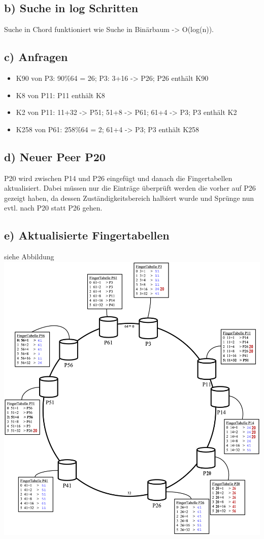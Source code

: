 \documentclass[11pt,a4paper]{scrartcl}
\begin{document}
\subsection*{b) Suche in log Schritten}
Suche in Chord funktioniert wie Suche in Binärbaum -> O(log(n)).


\subsection*{c) Anfragen}
\begin{itemize}
\item{K90 von P3:} 90\%64 = 26; P3: 3+16 -> P26; P26 enthält K90
\item{K8 von P11:} P11 enthält K8
\item{K2 von P11:} 11+32 -> P51; 51+8 -> P61; 61+4 -> P3; P3 enthält K2
\item{K258 von P61:} 258\%64 = 2; 61+4 -> P3; P3 enthält K258
\end{itemize}

\subsection*{d) Neuer Peer P20}
P20 wird zwischen P14 und P26 eingefügt und danach die Fingertabellen aktualisiert.
Dabei müssen nur die Einträge überprüft werden die vorher auf P26 gezeigt haben, da dessen Zuständigkeitsbereich halbiert wurde und Sprünge nun evtl. nach P20 statt P26 gehen.

\subsection*{e) Aktualisierte Fingertabellen}
siehe Abbildung\\
\includegraphics[width=\textwidth]{Chord2.png}
\end{document}
